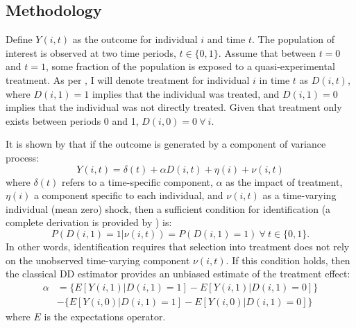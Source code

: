 \documentclass[12pt]{article}
\begin{document}
\begin{spacing}{1.3}
\nocite{Heckmanetal1998}

\section{Methodology}
Define $Y(i,t)$ as the outcome for individual $i$ and time $t$.  The population
of interest is observed at two time periods, $t\in \{0,1\}$. Assume that between
$t=0$ and $t=1$, some fraction of the population is exposed to a 
quasi-experimental treatment.  As per \citet{Abadie2005}, I will denote 
treatment for individual $i$ in time $t$ as $D(i,t)$, where $D(i,1)=1$ implies 
that the individual was treated, and $D(i,1)=0$ implies that the individual was
not directly treated.  Given that treatment only exists between periods 0 and 1,
$D(i,0)=0\ \forall\ i$.

It is shown by \citet{AshenfelterCard1985} that if the outcome is generated by
a component of variance process:
\begin{equation}
\label{Seqn:COV}
Y(i,t)=\delta(t) + \alpha D(i,t)+\eta(i)+\nu(i,t)
\end{equation}
where $\delta(t)$ refers to a time-specific component, $\alpha$ as the impact of 
treatment, $\eta(i)$ a component specific to each individual, and $\nu(i,t)$ as 
a time-varying individual (mean zero) shock, then a sufficient condition for 
identification (a complete derivation is provided by \citet{Abadie2005}) is:
\begin{equation}
\label{Seqn:ID}
P(D(i,1)=1|\nu(i,t))=P(D(i,1)=1) \ \forall\ t\in\{0,1\}.
\end{equation}
In other words, identification requires that selection into treatment does not
rely on the unobserved time-varying component $\nu(i,t)$.  If this condition 
holds, then the classical DD estimator provides an unbiased estimate of the
treatment effect:
\begin{equation}
\label{Seqn:DD}
\begin{split}
\alpha&=\{E[Y(i,1)|D(i,1)=1]-E[Y(i,1)|D(i,1)=0]\} \\
      &-\{E[Y(i,0)|D(i,1)=1]-E[Y(i,0)|D(i,1)=0]\}
\end{split}
\end{equation}
where $E$ is the expectations operator.


\end{spacing}
\end{document}
